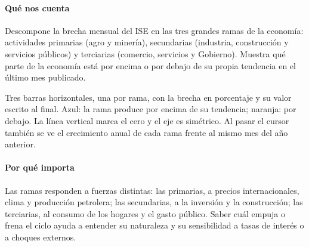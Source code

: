 \paragraph{Qué nos cuenta}
Descompone la brecha mensual del ISE en las tres grandes ramas de la economía: actividades primarias (agro y minería), secundarias (industria, construcción y servicios públicos) y terciarias (comercio, servicios y Gobierno). Muestra qué parte de la economía está por encima o por debajo de su propia tendencia en el último mes publicado.

\begin{leer}
Tres barras horizontales, una por rama, con la brecha en porcentaje y su valor escrito al final. Azul: la rama produce por encima de su tendencia; naranja: por debajo. La línea vertical marca el cero y el eje es simétrico. Al pasar el cursor también se ve el crecimiento anual de cada rama frente al mismo mes del año anterior.
\end{leer}

\paragraph{Por qué importa}
Las ramas responden a fuerzas distintas: las primarias, a precios internacionales, clima y producción petrolera; las secundarias, a la inversión y la construcción; las terciarias, al consumo de los hogares y el gasto público. Saber cuál empuja o frena el ciclo ayuda a entender su naturaleza y su sensibilidad a tasas de interés o a choques externos.

